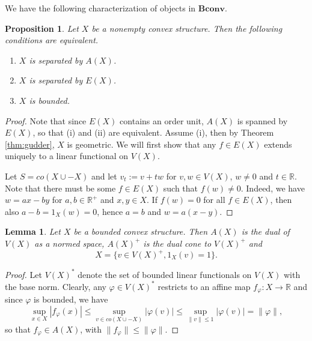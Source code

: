 \documentclass[12pt]{article}
\newtheorem{lemma}{Lemma}
\newtheorem{prop}{Proposition}
\newcommand{\<}{\langle}
\newcommand{\ct}[1]{\mathbf{#1}}
\begin{document}
We have the following characterization of objects in $\ct{Bconv}$.
\begin{prop} Let $X$ be a nonempty convex structure. Then the following conditions  are equivalent.
\begin{enumerate}
\item[(i)] $X$ is separated by $A(X)$.
\item[(ii)] $X$ is separated by $E(X)$.
\item[(iii)] $X$ is bounded.
\end{enumerate}

\end{prop}


\begin{proof} Note that since $E(X)$ contains an order unit, $A(X)$ is spanned by $E(X)$, so that (i) and (ii) are equivalent. Assume (i), then by
 Theorem \ref{thm:gudder}, $X$ is geometric. We will first show that any $f\in E(X)$ extends uniquely to a linear functional on $V(X)$.



Let $S=co(X\cup -X)$ and let $v_t:=v+tw$ for $v,w\in V(X)$, $w\ne 0$ and $t\in \mathbb R$. 
Note that there must be some $f\in E(X)$ such that $f(w)\ne0$. Indeed, we have $w=ax-by$ for $a,b\in \mathbb R^+$ and $x,y\in X$. If $f(w)=0$ for all $f\in E(X)$, 
 then also $a-b=1_X(w)=0$, hence $a=b$ and $w=a(x-y)$. 
  


\end{proof}


\begin{lemma} Let $X$ be a bounded convex structure. Then  $A(X)$ is the dual of $V(X)$ as a normed space, $A(X)^+$ is the dual cone to $V(X)^+$ and 
\[
X=\{v\in V(X)^+, 1_X(v)=1\}.
\]
\end{lemma}

\begin{proof} Let $V(X)^*$ denote the set of bounded linear functionals on $V(X)$ with the base norm. Clearly, any $\varphi\in V(X)^*$ restricts to an affine map 
$f_\varphi:X\to \mathbb R$ and since $\varphi$ is bounded, we have
\[
\sup_{x\in X} |f_\varphi(x)|\le \sup_{v\in co(X\cup -X)}|\varphi(v)|\le \sup_{\|v\|\le 1}|\varphi(v)|=\|\varphi\|,
\]
so that $f_\varphi\in A(X)$, with $\|f_\varphi\|\le \|\varphi\|$.


\end{proof}
\end{document}
